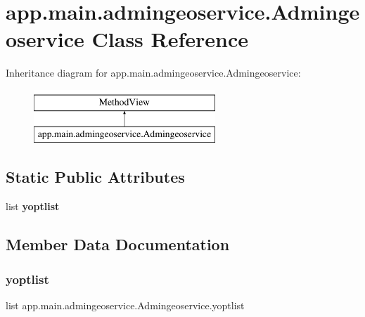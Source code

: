 \hypertarget{classapp_1_1main_1_1admingeoservice_1_1Admingeoservice}{}\section{app.\+main.\+admingeoservice.\+Admingeoservice Class Reference}
\label{classapp_1_1main_1_1admingeoservice_1_1Admingeoservice}
Inheritance diagram for app.\+main.\+admingeoservice.\+Admingeoservice\+:\begin{figure}[H]
\begin{center}
\leavevmode
\includegraphics[height=2.000000cm]{classapp_1_1main_1_1admingeoservice_1_1Admingeoservice}
\end{center}
\end{figure}
\subsection*{Static Public Attributes}
\begin{DoxyCompactItemize}
\item 
list {\bfseries yoptlist}
\end{DoxyCompactItemize}


\subsection{Member Data Documentation}
\mbox{\label{classapp_1_1main_1_1admingeoservice_1_1Admingeoservice_a7fcc9805c0e5bcbf6306a1db17883264}} 
\subsubsection{\texorpdfstring{yoptlist}{yoptlist}}
{\footnotesize\ttfamily list app.\+main.\+admingeoservice.\+Admingeoservice.\+yoptlist\hspace{0.3cm}{\ttfamily [static]}}

